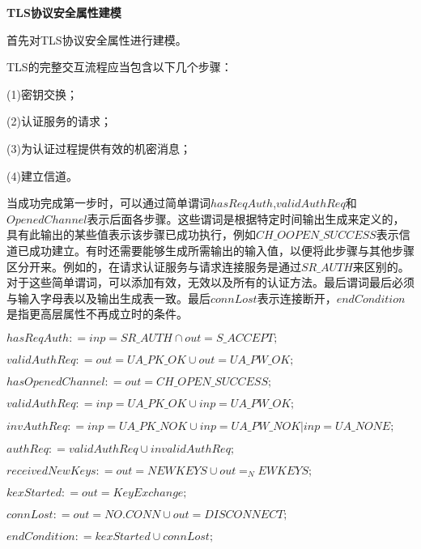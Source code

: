 \textbf{TLS协议安全属性建模}

首先对TLS协议安全属性进行建模。


TLS的完整交互流程应当包含以下几个步骤：

(1)密钥交换；

(2)认证服务的请求；

(3)为认证过程提供有效的机密消息；

(4)建立信道。

当成功完成第一步时，可以通过简单谓词$hasReqAuth$,$validAuthReq$和$OpenedChannel$表示后面各步骤。这些谓词是根据特定时间输出生成来定义的，具有此输出的某些值表示该步骤已成功执行，例如$CH\_OOPEN\_SUCCESS$表示信道已成功建立。有时还需要能够生成所需输出的输入值，以便将此步骤与其他步骤区分开来。例如的，在请求认证服务与请求连接服务是通过$SR\_AUTH$来区别的。对于这些简单谓词，可以添加有效，无效以及所有的认证方法。最后谓词最后必须与输入字母表以及输出生成表一致。最后$connLost$表示连接断开，$endCondition$是指更高层属性不再成立时的条件。

$hasReqAuth : = inp = SR\_AUTH \cap out =S\_ACCEPT ;$

$validAuthReq : = out =UA\_PK\_OK \cup out =UA\_PW\_OK ;$

$hasOpenedChannel : = out =CH\_OPEN\_SUCCESS ;$

$validAuthReq : = inp =UA\_PK\_OK \cup inp =UA\_PW\_OK ;$

$invAuthReq : = inp =UA\_PK\_NOK\cup inp =UA\_PW\_NOK| inp =UA\_NONE ;$

$authReq : = validAuthReq \cup invalidAuthReq ;$

$receivedNewKeys : = out =NEWKEYS \cup out =_NEWKEYS ;$

$kexStarted : = out =KeyExchange ;$

$connLost : = out =NO.CONN \cup out = DISCONNECT ;$

$endCondition : = kexStarted \cup connLost ;$






